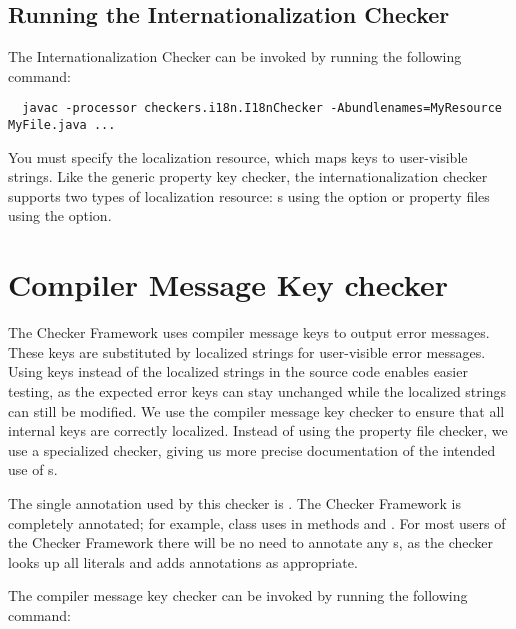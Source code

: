 \subsection{Running the Internationalization Checker\label{i18n-running}}

The Internationalization Checker can be invoked by running the following
command:

\begin{Verbatim}
  javac -processor checkers.i18n.I18nChecker -Abundlenames=MyResource MyFile.java ...
\end{Verbatim}

You must specify the localization resource, which maps keys to user-visible
strings.  Like the generic property key checker, the internationalization checker
supports two types of localization resource:
s using the 
 option
or property files using the
 option.



\section{Compiler Message Key checker\label{compilermsgs-checker}}

The Checker Framework uses compiler message keys to output error messages.
These keys are substituted by localized strings for user-visible error messages.
Using keys instead of the localized strings in the source code enables easier
testing, as the expected error keys can stay unchanged while the localized
strings can still be modified. 
We use the compiler message key checker to ensure that all internal
keys are correctly localized.
Instead of using the property file checker, we use a specialized checker,
giving us more precise documentation of the intended use of s.

The single annotation used by this checker is 
.
The Checker Framework is completely annotated;
for example, class 
uses  in methods  and .
For most users of the Checker Framework there will be no need to annotate any
s, as the checker looks up all  literals and adds
annotations as appropriate.

The compiler message key checker can be invoked by running the following
command:

